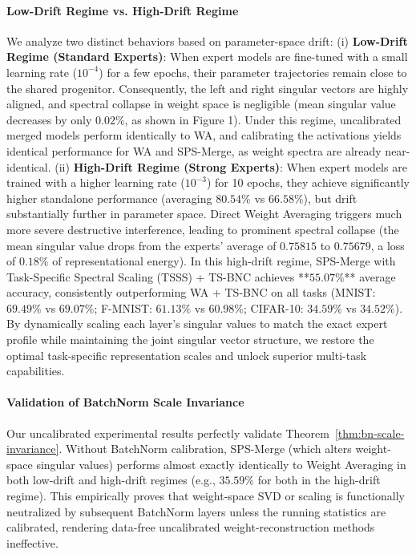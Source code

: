 \documentclass{article}
\theoremstyle{plain}
\theoremstyle{definition}
\theoremstyle{remark}
\begin{document}
\paragraph{Low-Drift Regime vs. High-Drift Regime}
We analyze two distinct behaviors based on parameter-space drift: (i) \textbf{Low-Drift Regime (Standard Experts)}: When expert models are fine-tuned with a small learning rate ($10^{-4}$) for a few epochs, their parameter trajectories remain close to the shared progenitor. Consequently, the left and right singular vectors are highly aligned, and spectral collapse in weight space is negligible (mean singular value decreases by only $0.02\%$, as shown in Figure 1). Under this regime, uncalibrated merged models perform identically to WA, and calibrating the activations yields identical performance for WA and SPS-Merge, as weight spectra are already near-identical. (ii) \textbf{High-Drift Regime (Strong Experts)}: When expert models are trained with a higher learning rate ($10^{-3}$) for 10 epochs, they achieve significantly higher standalone performance (averaging $80.54\%$ vs $66.58\%$), but drift substantially further in parameter space. Direct Weight Averaging triggers much more severe destructive interference, leading to prominent spectral collapse (the mean singular value drops from the experts' average of $0.75815$ to $0.75679$, a loss of $0.18\%$ of representational energy). In this high-drift regime, SPS-Merge with Task-Specific Spectral Scaling (TSSS) + TS-BNC achieves **$55.07\%$** average accuracy, consistently outperforming WA + TS-BNC on all tasks (MNIST: $69.49\%$ vs $69.07\%$; F-MNIST: $61.13\%$ vs $60.98\%$; CIFAR-10: $34.59\%$ vs $34.52\%$). By dynamically scaling each layer's singular values to match the exact expert profile while maintaining the joint singular vector structure, we restore the optimal task-specific representation scales and unlock superior multi-task capabilities.

\paragraph{Validation of BatchNorm Scale Invariance}
Our uncalibrated experimental results perfectly validate Theorem~\ref{thm:bn-scale-invariance}. Without BatchNorm calibration, SPS-Merge (which alters weight-space singular values) performs almost exactly identically to Weight Averaging in both low-drift and high-drift regimes (e.g., $35.59\%$ for both in the high-drift regime). This empirically proves that weight-space SVD or scaling is functionally neutralized by subsequent BatchNorm layers unless the running statistics are calibrated, rendering data-free uncalibrated weight-reconstruction methods ineffective.
\end{document}
